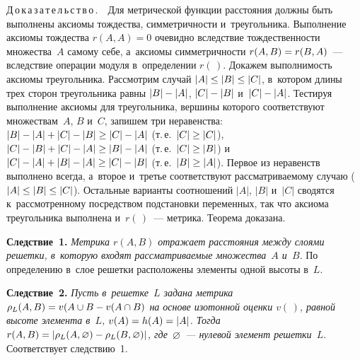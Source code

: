 \begin{multicols}{2}
\noindent
Д\,о\,к\,а\,з\,а\,т\,е\,л\,ь\,с\,т\,в\,о\,.\ \ Для метрической функции 
расстояния должны быть выполнены аксиомы тож\-дест\-ва, симметричности 
и~треугольника. Выполнение аксиомы тождества 
$r({A},{A})=0$ очевидно вследствие тождественности 
множества~$A$ самому себе, а~аксиомы симметричности 
$r({A},{B})\hm=r({B},{A})$~--- вследствие 
операции модуля в~определении $r(\,)$. Докажем выполнимость аксиомы 
треугольника. Рассмотрим случай $\vert {A}\vert \hm\leq \vert 
{B}\vert \hm\leq \vert {C}\vert$, в~котором длины трех сторон 
треугольника равны $\vert {B}\vert \hm- \vert {A}\vert $, $\vert 
{C}\vert \hm- \vert {B}\vert$ и~$\vert {C}\vert \hm- 
\vert {A}\vert$. Тестируя выполнение аксиомы для треугольника, 
вершины которого соответствуют множествам~$A$, $B$ и~$C$, запишем три 
неравенства: $\vert {B}\vert \hm- \vert {A}\vert \hm+\vert {C}\vert \hm- \vert {B}\vert \hm\geq 
\vert {C}\vert \hm- \vert {A}\vert$ (т.\,е.\ $\vert {C}\vert \hm 
\geq \vert {C}\vert$), $\vert {C}\vert \hm- \vert {B}\vert 
\hm+\vert {C}\vert \hm- \vert {A}\vert \hm\geq \vert {B}\vert 
\hm- \vert {A}\vert$ (т.\,е.\ $\vert {C}\vert \hm\geq 
\vert {B}\vert$) и~$\vert {C}\vert \hm- \vert {A}\vert 
\hm+\vert {B}\vert \hm- \vert {A}\vert \hm\geq \vert {C}\vert 
\hm- \vert {B}\vert$ (т.\,е.\ $\vert {B}\vert \hm\geq 
\vert {A}\vert$). Первое из неравенств выполнено всегда, а~второе 
и~третье соответствуют рассматриваемому случаю ($\vert {A}\vert 
\hm\leq \vert {B}\vert \hm\leq \vert {C}\vert$). Остальные 
варианты соотношений $\vert {A}\vert$, $\vert {B}\vert$ 
и~$\vert {C}\vert$ сводятся к~рассмотренному посредством подстановки 
переменных, так что аксиома треугольника выполнена и~$r(\,)$~--- метрика. 
Тео\-ре\-ма доказана.

\smallskip

\noindent
\textbf{Следствие~1.} \textit{Метрика $r({A}, {B})$ отражает 
расстояния между слоями решетки, в~которую входят рас\-смат\-ри\-ва\-емые 
множества~${A}$ и~${B}$}. По определению в~слое решетки 
расположены элементы одной высоты в~$L$. 

\smallskip

\noindent
\textbf{Следствие~2.} \textit{Пусть в~решетке~$L$ задана метрика 
$\rho_L({A},{B})\hm= v({A}\cup{B}\hm- 
v({A}\cap {B})$ на основе изотонной оценки $v(\,)$, рав\-ной 
высоте элемента в~$L$, $v({A})\hm= h({A})\hm=\vert 
{A}\vert$. Тогда $r({A},{B})\hm= \vert \rho_L 
({A},\varnothing)\hm- \rho_L({B},\varnothing)\vert$, 
где~$\varnothing$~--- нулевой элемент решетки~$L$}. Соответствует 
следствию~1.


\end{multicols}
